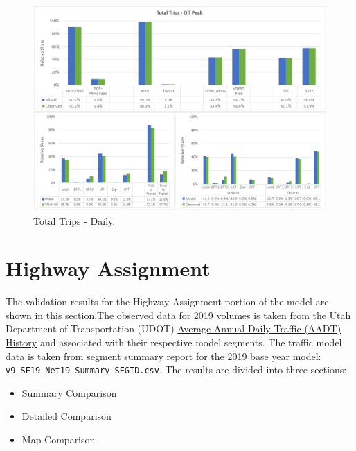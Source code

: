 \documentclass[
  letterpaper,
  DIV=11,
  numbers=noendperiod]{scrreprt}
\providecommand{\tightlist}{%
  \setlength{\itemsep}{0pt}\setlength{\parskip}{0pt}}\usepackage{longtable,booktabs,array}
\begin{document}
\begin{figure}[H]

{\centering \includegraphics{v9x/v900/validation/_pictures/6-plot4.png}

}

\caption{\label{fig-pdf-trips-ok}Total Trips - Daily.}

\end{figure}


\hypertarget{highway-assignment}{%
\chapter{Highway Assignment}\label{highway-assignment}}

The validation results for the Highway Assignment portion of the model
are shown in this section.The observed data for 2019 volumes is taken
from the Utah Department of Transportation (UDOT)
\href{https://drive.google.com/file/d/1rDXm0ObugGR1zXgWUuVbzWHNt-Xs1xru/view}{Average
Annual Daily Traffic (AADT) History} and associated with their
respective model segments. The traffic model data is taken from segment
summary report for the 2019 base year model:
\texttt{v9\_SE19\_Net19\_Summary\_SEGID.csv}. The results are divided
into three sections:

\begin{itemize}
\tightlist
\item
  Summary Comparison
\item
  Detailed Comparison
\item
  Map Comparison
\end{itemize}
\end{document}
